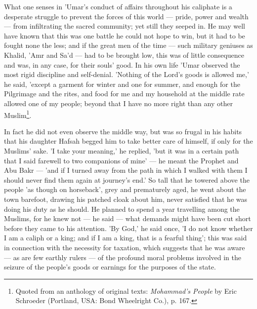 \documentclass[11pt, b5paper, twoside]{book}
\begin{document}
What one senses in 'Umar's conduct of affairs throughout his caliphate is a desperate struggle to prevent the forces of this world --- pride, power and wealth --- from infiltrating the sacred community; yet still they seeped in. He may well have known that this was one battle he could not hope to win, but it had to be fought none the less; and if the great men of the time --- such military geniuses as Khalid, 'Amr and Sa'd --- had to be brought low, this was of little consequence and was, in any case, for their souls' good. In his own life 'Umar observed the most rigid discipline and self-denial. 'Nothing of the Lord's goods is allowed me,' he said, 'except a garment for winter and one for summer, and enough for the Pilgrimage and the rites, and food for me and my household at the middle rate allowed one of my people; beyond that I have no more right than any other Muslim\footnote{Quoted from an anthology of original texts: \emph{Mohammad's People} by Eric Schroeder (Portland, USA: Bond Wheelright Co.), p. 167.}.

In fact he did not even observe the middle way, but was so frugal in his habits that his daughter Hafsah begged him to take better care of himself, if only for the Muslims' sake. 'I take your meaning,' he replied, 'but it was in a certain path that I said farewell to two companions of mine' --- he meant the Prophet and Abu Bakr --- 'and if I turned away from the path in which I walked with them I should never find them again at journey's end.' So tall that he towered above the people 'as though on horseback', grey and prematurely aged, he went about the town barefoot, drawing his patched cloak about him, never satisfied that he was doing his duty as he should. He planned to spend a year travelling among the Muslims, for he knew not --- he said --- what demands might have been cut short before they came to his attention. 'By God,' he said once, 'I do not know whether I am a caliph or a king; and if I am a king, that is a fearful thing'; this was said in connection with the necessity for taxation, which suggests that he was aware --- as are few earthly rulers --- of the profound moral problems involved in the seizure of the people's goods or earnings for the purposes of the state. \\
\end{document}

